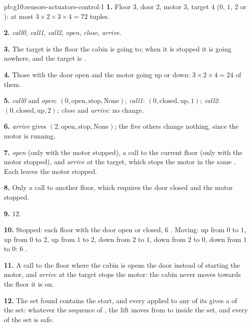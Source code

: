 \begin{solution}{pb:g10:sensors-actuators-control:1}
\textbf{1.} Floor $3$, door $2$, motor $3$, target $4$ ($0$, $1$, $2$ or ): at most
$3 \times 2 \times 3 \times 4 = 72$ tuples.

\textbf{2.} \textit{call0}, \textit{call1}, \textit{call2}, \textit{open}, \textit{close}, \textit{arrive}.

\textbf{3.} The target is the floor the cabin is going to; when it is stopped it is going nowhere, and the target is
.

\textbf{4.} Those with the door open and the motor going up or down: $3 \times 2 \times 4 = 24$ of them.

\textbf{5.} \textit{call0} and \textit{open}: $(0, \text{open}, \text{stop}, \text{None})$; \textit{call1}:
$(0, \text{closed}, \text{up}, 1)$; \textit{call2}: $(0, \text{closed}, \text{up}, 2)$; \textit{close} and
\textit{arrive}: no change.

\textbf{6.} \textit{arrive} gives $(2, \text{open}, \text{stop}, \text{None})$; the five others change nothing, since
the motor is running.

\textbf{7.} \textit{open} (only with the motor stopped), a call to the current floor (only with the motor stopped),
and \textit{arrive} at the target, which stops the motor in the same . Each leaves the motor stopped.

\textbf{8.} Only a call to another floor, which requires the door closed and the motor stopped.

\textbf{9.} $12$.

\textbf{10.} Stopped: each floor with the door open or closed, $6$ . Moving: up from $0$ to $1$, up from $0$ to
$2$, up from $1$ to $2$, down from $2$ to $1$, down from $2$ to $0$, down from $1$ to $0$: $6$ .

\textbf{11.} A call to the floor where the cabin is opens the door instead of starting the motor, and \textit{arrive}
at the target stops the motor: the cabin never moves towards the floor it is on.

\textbf{12.} The set found contains the start, and every  applied to any of its  gives a  of the set:
whatever the sequence of , the lift moves from  to  inside the set, and every  of the set is
safe.


\end{solution}
